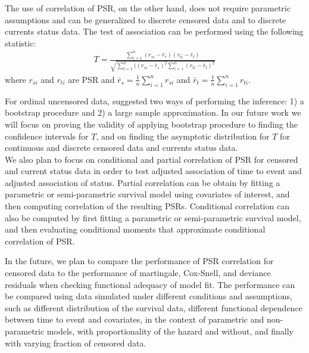 \documentclass[]{article}
\begin{document}
The use of correlation of PSR, on the other hand, does not require parametric assumptions and can be generalized to discrete censored data and to discrete currents status data. The test of association can be performed using the following statistic:
$$
\begin{aligned}
	T = \frac{\sum_{i=1}^{n} (r_{si} - \bar{r}_s)(r_{ti} - \bar{r}_t)}{\sqrt{\sum_{i=1}^{n} ((r_{si} - \bar{r}_s)^2\sum_{i=1}^{n} (r_{ti} - \bar{r}_t)^2}}
\end{aligned}
$$
where $r_{si}$ and $r_{ti}$ are PSR and $\bar{r}_s = \frac{1}{n}\sum_{i=1}^{n} r_{si}$ and $\bar{r}_t = \frac{1}{n}\sum_{i=1}^{n} r_{ti}$.

For ordinal uncensored data, \cite{li2010test} suggested two ways of performing the inference: 1) a bootstrap procedure and 2) a large sample approximation. In our future work we will focus on proving the validity of applying bootstrap procedure to finding the confidence intervals for $T$, and on finding the asymptotic distribution for $T$ for continuous and discrete censored data and currents status data.\\

We also plan to focus on conditional and partial correlation of PSR for censored and current status data in order to test adjusted association of time to event and adjusted association of status. Partial correlation can be obtain by fitting a parametric or semi-parametric survival model using covariates of interest, and then computing correlation of the resulting PSRs. Conditional correlation can also be computed by first fitting a parametric or semi-parametric survival model, and then evaluating conditional moments that approximate conditional correlation of PSR.

In the future, we plan to compare the performance of PSR correlation for censored data to the performance of martingale, Cox-Snell, and deviance residuals when checking functional adequacy of model fit. The performance can be compared using data simulated under different conditions and assumptions, such as different distribution of the survival data, different functional dependence between time to event and covariates, in the context of parametric and non-parametric models, with proportionality of the hazard and without, and finally with varying fraction of censored data.
\end{document}

